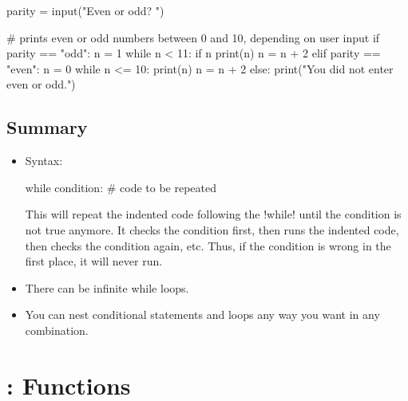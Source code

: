 \documentclass[11pt]{cselabheader}
\begin{document}
{\begin{python3code}
parity = input("Even or odd? ")

# prints even or odd numbers between 0 and 10, depending on user input
if parity == "odd":
    n = 1
    while n < 11:
        if n %
            print(n)
        n = n + 2
elif parity == "even":
    n = 0
    while n <= 10:
        print(n)
        n = n + 2
else:
    print("You did not enter even or odd.")
\end{python3code}

\subsection{Summary}

\begin{itemize}
    \item Syntax:

      \begin{python3code}
while condition:
    # code to be repeated
      \end{python3code}

    This will repeat the indented code following the \pythoninline!while! until
    the condition is not true anymore. It checks the condition first, then runs
    the indented code, then checks the condition again, etc. Thus, if the
    condition is wrong in the first place, it will never run.

%
%

  \item There can be infinite while loops.
  \item You can nest conditional statements and loops any way you want in any
    combination.
\end{itemize}

\pagebreak
\section{\protect{}: Functions}
\label{sec:funcs}

}
\end{document}

